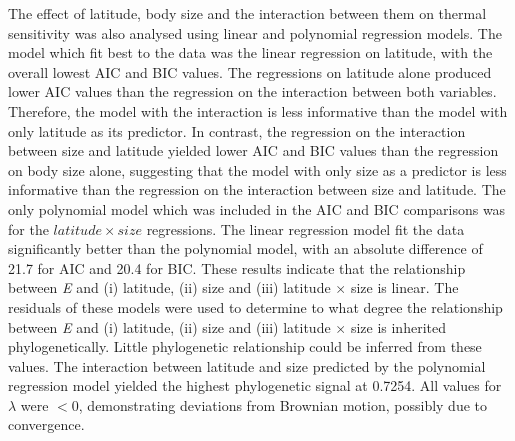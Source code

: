 \documentclass[11pt]{article}
\begin{document}
\begin{flushleft}
The effect of latitude, body size and the interaction between them on thermal sensitivity was also analysed using linear and polynomial regression models. The model which fit best to the data was the linear regression on latitude, with the overall lowest AIC and BIC values. The regressions on latitude alone produced lower AIC values than the regression on the interaction between both variables. Therefore, the model with the interaction is less informative than the model with only latitude as its predictor. In contrast, the regression on the interaction between size and latitude yielded lower AIC and BIC values than the regression on body size alone, suggesting that the model with only size as a predictor is less informative than the regression on the interaction between size and latitude. The only polynomial model which was included in the AIC and BIC comparisons was for the \emph{$latitude \times size$} regressions. The linear regression model fit the data significantly better than the polynomial model, with an absolute difference of 21.7 for AIC and  20.4 for BIC. These results indicate that the relationship between \emph{E} and (i) latitude, (ii) size and (iii) latitude $\times$ size is linear.
The residuals of these models were used to determine to what degree the relationship between \emph{E} and (i) latitude, (ii) size and (iii) latitude $\times$ size is inherited phylogenetically. Little phylogenetic relationship could be inferred from these values. The interaction between latitude and size predicted by the polynomial regression model yielded the highest phylogenetic signal at 0.7254. All values for $\lambda$ were $<0$, demonstrating deviations from Brownian motion, possibly due to convergence.
\linebreak


\end{flushleft}
\end{document}

